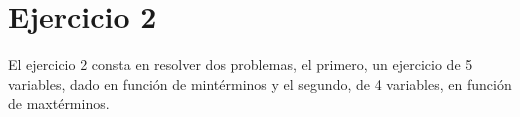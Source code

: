 \section{Ejercicio 2}
\noindent
El ejercicio 2 consta en resolver dos problemas, el primero, un ejercicio de 5 variables, dado en funci\'on de mint\'erminos y el segundo, de 4 variables, en funci\'on de maxt\'erminos.\par



